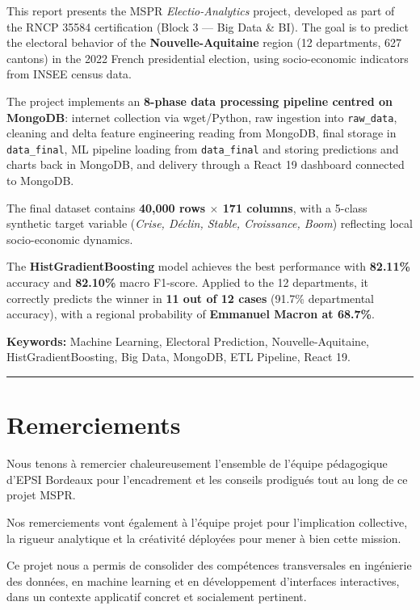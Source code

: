 This report presents the MSPR \textit{Electio-Analytics} project, developed as part of
the RNCP 35584 certification (Block 3 — Big Data \& BI). The goal is to predict the
electoral behavior of the \textbf{Nouvelle-Aquitaine} region (12 departments, 627 cantons)
in the 2022 French presidential election, using socio-economic indicators from INSEE census data.

The project implements an \textbf{8-phase data processing pipeline centred on MongoDB}:
internet collection via wget/Python, raw ingestion into \texttt{raw\_data}, cleaning and
delta feature engineering reading from MongoDB, final storage in \texttt{data\_final},
ML pipeline loading from \texttt{data\_final} and storing predictions and charts back in
MongoDB, and delivery through a React 19 dashboard connected to MongoDB.

The final dataset contains \textbf{40,000 rows $\times$ 171 columns}, with a 5-class synthetic
target variable (\textit{Crise, Déclin, Stable, Croissance, Boom}) reflecting local
socio-economic dynamics.

The \textbf{HistGradientBoosting} model achieves the best performance with \textbf{82.11\%}
accuracy and \textbf{82.10\%} macro F1-score. Applied to the 12 departments, it correctly
predicts the winner in \textbf{11 out of 12 cases} (91.7\% departmental accuracy), with
a regional probability of \textbf{Emmanuel Macron at 68.7\%}.

\vspace{0.5cm}
\noindent\textbf{Keywords:} Machine Learning, Electoral Prediction, Nouvelle-Aquitaine,
HistGradientBoosting, Big Data, MongoDB, ETL Pipeline, React 19.

\bigskip
\hrule
\bigskip

\chapter*{Remerciements}
\thispagestyle{plain}

Nous tenons à remercier chaleureusement l'ensemble de l'équipe pédagogique d'EPSI
Bordeaux pour l'encadrement et les conseils prodigués tout au long de ce projet MSPR.

Nos remerciements vont également à l'équipe projet pour l'implication collective,
la rigueur analytique et la créativité déployées pour mener à bien cette mission.

Ce projet nous a permis de consolider des compétences transversales en ingénierie
des données, en machine learning et en développement d'interfaces interactives,
dans un contexte applicatif concret et socialement pertinent.
